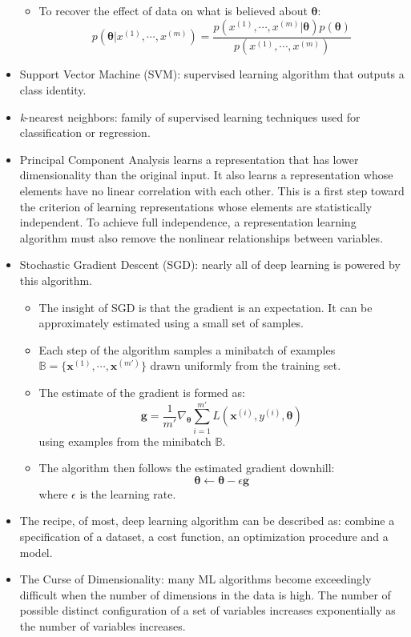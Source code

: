 \documentclass{article}
\begin{document}
\begin{itemize}
\begin{itemize}
\item To recover the effect of data on what is believed about \(\boldsymbol{\theta}\):
\[
	p(\boldsymbol{\theta} | x^{(1)}, \cdots, x^{(m)}) = \frac{p(x^{(1)}, \cdots, x^{(m)} | \boldsymbol{\theta})p(\boldsymbol{\theta})}{p(x^{(1)}, \cdots, x^{(m)})}
\]
\end{itemize}
\item Support Vector Machine (SVM): supervised learning algorithm that outputs a class identity.
\item \textit{k}-nearest neighbors: family of supervised learning techniques used for classification or regression.
\item Principal Component Analysis learns a representation that has lower dimensionality than the original input. It also learns a representation whose elements have no linear correlation with each other. This is a first step toward the criterion of learning representations whose elements are statistically independent. To achieve full independence, a representation learning algorithm must also remove the nonlinear relationships between variables.
\item Stochastic Gradient Descent (SGD): nearly all of deep learning is powered by this algorithm.
\begin{itemize}
\item The insight of SGD is that the gradient is an expectation. It can be approximately estimated using a small set of samples.
\item Each step of the algorithm samples a minibatch of examples \(\mathbb{B} = \{\boldsymbol{x}^{(1)}, \cdots, \boldsymbol{x}^{(m')}\}\) drawn uniformly from the training set.
\item The estimate of the gradient is formed as:
\[
	\boldsymbol{g} = \frac{1}{m'}\nabla_{\boldsymbol{\theta}}\sum^{m'}_{i=1} L(\boldsymbol{x}^{(i)}, y^{(i)}, \boldsymbol{\theta})
\]
using examples from the minibatch \(\mathbb{B}\).
\item The algorithm then follows the estimated gradient downhill:
\[
	\boldsymbol{\theta} \gets \boldsymbol{\theta} - \epsilon\boldsymbol{g}
\]
where \(\epsilon\) is the learning rate.
\end{itemize}
\item The recipe, of most, deep learning algorithm can be described as: combine a specification of a dataset, a cost function, an optimization procedure and a model.
\item The Curse of Dimensionality: many ML algorithms become exceedingly difficult when the number of dimensions in the data is high. The number of possible distinct configuration of a set of variables increases exponentially as the number of variables increases.

\end{itemize}
\end{document}

